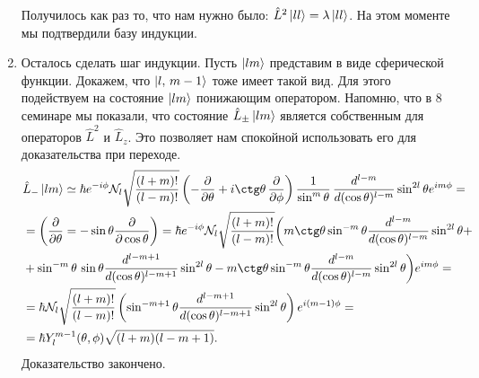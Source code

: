 \begin{enumerate}
    Получилось как раз то, что нам нужно было: $\hat{L}^2 \ket{ll} = \lambda \ket{ll}$. На этом моменте мы подтвердили базу индукции.
    \item Осталось сделать шаг индукции. Пусть $\ket{lm}$ представим в виде сферической функции. Докажем, что $\ket{l,\, m-1}$ тоже имеет такой вид. Для этого подействуем на состояние $\ket{lm}$ понижающим оператором. Напомню, что в 8 семинаре мы показали, что состояние $\hat{L}_{\pm}\ket{lm}$ является собственным для операторов $\hat{L}^2$ и $\hat{L}_z$. Это позволяет нам спокойной использовать его для доказательства при переходе.
    \begin{align*}
        &\hat{L}_-\ket{lm} \simeq \hbar e^{-i\phi}\mathcal{N}_l\sqrt{\frac{(l+m)!}{(l-m)!}}\left(-\frac{\partial}{\partial \theta} + i \ctg\theta\,\frac{\partial}{\partial \phi} \right)  \frac{1}{\sin^{m}\theta}\,\frac{d^{l-m}}{d(\cos\theta)^{l-m}}\sin^{2l}\theta e^{im\phi} = \\
        & = \left(\frac{\partial}{\partial \theta} =  -\sin\theta \frac{\partial}{\partial \cos\theta}\right) = \hbar e^{-i\phi} \mathcal{N}_l \sqrt{\frac{(l+m)!}{(l-m)!}} \biggl(m\ctg\theta\sin^{-m}\theta\frac{d^{l-m}}{d(\cos\theta)^{l-m}}\sin^{2l}\theta + \\
        & + \sin^{-m}\theta \, \sin\theta \frac{d^{l-m+1}}{d(\cos\theta)^{l-m+1}} \sin^{2l}\theta - m\ctg\theta\sin^{-m}\theta\frac{d^{l-m}}{d(\cos\theta)^{l-m}} \sin^{2l}\theta \biggl)e^{im\phi} = \\
        & = \hbar\mathcal{N}_l\sqrt{\frac{(l+m)!}{(l-m)!}} \left( \sin^{-m+1}\theta \frac{d^{l-m+1}}{d(\cos\theta)^{l-m+1}} \sin^{2l}\theta \right) e^{i (m-1) \phi} = \\
        & =\hbar Y^{m-1}_l(\theta, \phi)\sqrt{(l+m)(l-m+1)}.
    \end{align*}
    Доказательство закончено.
\end{enumerate}